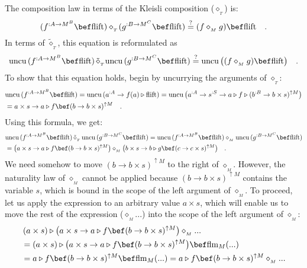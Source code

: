 The composition law in terms of the Kleisli composition ($\diamond_{_{T}}$)
is:
\[
(f^{:A\rightarrow M^{B}}\bef\text{flift})\diamond_{_{T}}\!(g^{:B\rightarrow M^{C}}\bef\text{flift})\overset{?}{=}(f\diamond_{_{M}}g)\bef\text{flift}\quad.
\]
In terms of $\tilde{\diamond}_{_{T}}$, this equation is reformulated
as
\[
\text{uncu}\,(f^{:A\rightarrow M^{B}}\bef\text{flift})\,\tilde{\diamond}_{_{T}}\text{uncu}\,(g^{:B\rightarrow M^{C}}\bef\text{flift})\overset{?}{=}\text{uncu}\,\big((f\diamond_{_{M}}g)\bef\text{flift}\big)\quad.
\]
To show that this equation holds, begin by uncurrying the arguments
of $\diamond_{_{T}}$:
\begin{align*}
 & \text{uncu}\,(f^{:A\rightarrow M^{B}}\bef\text{flift})=\text{uncu}\,(a^{:A}\rightarrow f(a)\triangleright\text{flift})=\text{uncu}\,\big(a^{:A}\rightarrow s^{:S}\rightarrow a\triangleright f\triangleright(b^{:B}\rightarrow b\times s)^{\uparrow M}\big)\\
 & =a\times s\rightarrow a\triangleright f\bef(b\rightarrow b\times s)^{\uparrow M}\quad.
\end{align*}
Using this formula, we get:
\begin{align*}
 & \text{uncu}\,(f^{:A\rightarrow M^{B}}\bef\text{flift})\,\tilde{\diamond}_{_{T}}\,\text{uncu}\,(g^{:B\rightarrow M^{C}}\bef\text{flift})=\text{uncu}\,(f^{:A\rightarrow M^{B}}\bef\text{flift})\diamond_{_{M}}\text{uncu}\,(g^{:B\rightarrow M^{C}}\bef\text{flift})\\
 & =\big(a\times s\rightarrow a\triangleright f\bef(b\rightarrow b\times s)^{\uparrow M}\big)\diamond_{_{M}}\big(b\times s\rightarrow b\triangleright g\bef(c\rightarrow c\times s)^{\uparrow M}\big)\quad.
\end{align*}
We need somehow to move $(b\rightarrow b\times s)^{\uparrow M}$ to
the right of $\diamond_{_{M}}$. However, the naturality law of $\diamond_{_{M}}$
cannot be applied because $(b\rightarrow b\times s)^{\uparrow M}$
contains the variable $s$, which is bound in the scope of the left
argument of $\diamond_{_{M}}$. To proceed, let us apply the expression
to an arbitrary value $a\times s$, which will enable us to move the
rest of the expression ($\diamond_{_{M}}...$) into the scope of the
left argument of $\diamond_{_{M}}$:
\begin{align*}
 & \left(a\times s\right)\triangleright\big(a\times s\rightarrow a\triangleright f\bef(b\rightarrow b\times s)^{\uparrow M}\big)\diamond_{_{M}}...\\
 & =\left(a\times s\right)\triangleright\big(a\times s\rightarrow a\triangleright f\bef(b\rightarrow b\times s)^{\uparrow M}\big)\bef\text{flm}_{M}(...)\\
 & =a\triangleright f\bef(b\rightarrow b\times s)^{\uparrow M}\bef\text{flm}_{M}(...)=a\triangleright f\bef(b\rightarrow b\times s)^{\uparrow M}\diamond_{_{M}}...
\end{align*}
